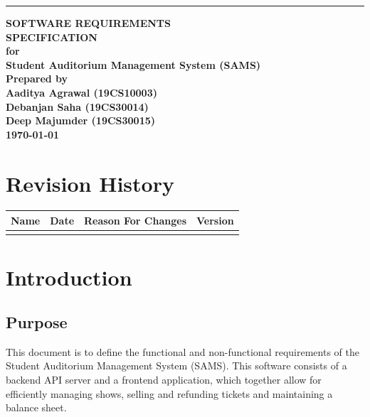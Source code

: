 \documentclass{scrreprt}
\date{}
\begin{document}
\thispagestyle{empty}
\begin{flushright}
    \rule{16cm}{5pt}\vskip1cm
    \bfseries{
        \Huge{SOFTWARE REQUIREMENTS\\ SPECIFICATION}\\
        \vspace{1.9cm}
        for\\
        \vspace{1.9cm}
        Student Auditorium Management System (SAMS)\\
        \vspace{1.9cm}
        Prepared by \\
        Aaditya Agrawal (19CS10003)\\
        Debanjan Saha (19CS30014) \\
        Deep Majumder (19CS30015) \\ 
        \vspace{1.9cm}
        \today\\
}
\end{flushright}

\tableofcontents


\chapter*{Revision History}

\begin{center}
    \begin{tabular}{|c|c|c|c|}
        \hline
	    Name & Date & Reason For Changes & Version\\
        \hline
	     &  &  & \\
        \hline
    \end{tabular}
\end{center}

\chapter{Introduction}

\section{Purpose}
This document is to define the functional and non-functional requirements of the Student Auditorium Management System (SAMS). This software consists of a backend API server and a frontend application, which together allow for efficiently managing shows, selling and refunding tickets and maintaining a balance sheet.
\end{document}
